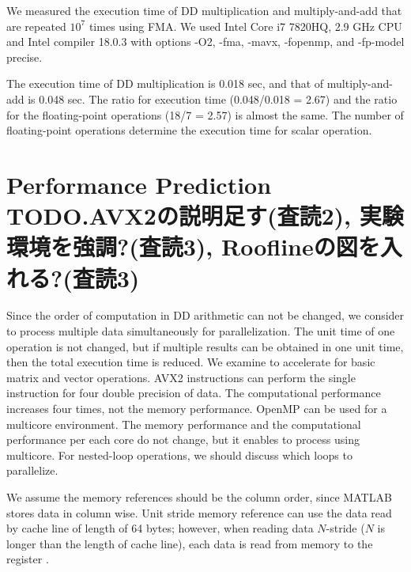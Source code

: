 \documentclass{IOS-Book-Article}
\begin{document}
We measured the execution time of DD multiplication and multiply-and-add that are repeated $10^7$ times using FMA.
We used Intel Core i7 7820HQ, 2.9 GHz CPU and Intel compiler 18.0.3 with options -O2, -fma, -mavx, -fopenmp, and -fp-model precise. 

The execution time of DD multiplication is 0.018 sec, and that of multiply-and-add is 0.048 sec. The ratio for execution time (0.048/0.018 = 2.67) and the ratio for the floating-point operations (18/7 = 2.57) is almost the same. The number of floating-point operations determine the execution time for scalar operation.

\section{Performance Prediction TODO.AVX2の説明足す(査読2), 実験環境を強調?(査読3), Rooflineの図を入れる?(査読3)}
Since the order of computation in DD arithmetic can not be changed, we consider to process multiple data simultaneously for parallelization.
The unit time of one operation is not changed, but if multiple results can be obtained in one unit time, then the total execution time is reduced.
We examine to accelerate for basic matrix and vector operations.
AVX2 instructions \cite{SIMD} can perform the single instruction for four double precision of data. The computational performance increases four times, not the memory performance.
OpenMP \cite{omp} can be used for a multicore environment. The memory performance and the computational performance per each core do not change, but it enables to process using multicore. For nested-loop operations, we should discuss which loops to parallelize. 

We assume the memory references should be the column order, since MATLAB stores data in column wise. Unit stride memory reference can use the data read by cache line of length of 64 bytes; however, when reading data $N$-stride ($N$ is longer than the length of cache line), each data is read from memory to the register \cite{HPC}. 
\end{document}
